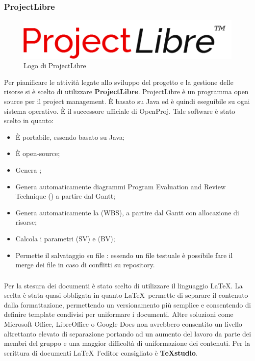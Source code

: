 \documentclass[../NormeDiProgetto.tex]{subfiles}
\begin{document}
			\subsubsection{ProjectLibre}
			\begin{figure} [h!]
				\centering
				\includegraphics[scale=0.3]{./Immagini/Libre.png}
				\caption{Logo di ProjectLibre}\label{}
			\end{figure}
				Per pianificare le attività legate allo sviluppo del progetto e la gestione delle risorse
				si è scelto di utilizzare \textbf{ProjectLibre}.
				ProjectLibre è un programma open source per il project management. È basato su Java ed è
				quindi eseguibile su ogni sistema operativo. È il successore ufficiale di OpenProj. Tale
				software è stato scelto in quanto:
				\begin{itemize}
					\item È portabile, essendo basato su Java;
					\item È open-source;
					\item Genera ;
					\item Genera automaticamente diagrammi Program Evaluation and Review Technique ()
					a partire dal Gantt;
					\item Genera automaticamente la  (WBS), a partire dal Gantt
					con allocazione di risorse;
					\item Calcola i parametri (SV) e  (BV);
					\item Permette il salvataggio su file : essendo un file testuale è possibile
					fare il merge dei file in caso di conflitti su repository. 
				\end{itemize}
			\subsubsection{\gl{\LaTeX}}
				Per la stesura dei documenti è stato scelto di utilizzare il linguaggio \LaTeX.
				La scelta è stata quasi obbligata in quanto \LaTeX\ permette di separare il contenuto dalla
				formattazione, permettendo un versionamento più semplice e consentendo di definire template
				condivisi per uniformare i documenti. Altre soluzioni come Microsoft Office, LibreOffice o
				Google Docs non avrebbero consentito un livello altrettanto elevato di separazione portando
				ad un aumento del lavoro da parte dei membri del gruppo e una maggior difficoltà di
				uniformazione dei contenuti.
				Per la scrittura di documenti \LaTeX\ l'editor consigliato è \textbf{TeXstudio}.
\end{document}
